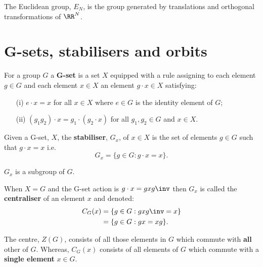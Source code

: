\documentclass[12pt, a4paper]{article}
\begin{document}
\begin{mdthm}
    The Euclidean group, \(E_N\), is the group generated by translations and orthogonal transformations of \(\RR^N\).
\end{mdthm}

\pagebreak

\section{G-sets, stabilisers and orbits}

\begin{definition}
    For a group \(G\) a \textbf{G-set} is a set \(X\) equipped with a rule assigning to each element \(g\in G\) and each element \(x\in X\) an element \(g\cdot x \in X\) satisfying:
    \begin{itemize}
    \item[(i)] \(e \cdot x =x\) for all \(x \in X\) where \(e \in G\) is the identity element of \(G\);
    \item[(ii)] \((g_1g_2)\cdot x =g_1\cdot(g_2 \cdot x)\) for all \(g_1,g_2 \in G\) and \(x\in X\).
    \end{itemize}
\end{definition}

\begin{definition}
    Given a G-set, \(X\), the \textbf{stabiliser}, \(G_x\), of \(x \in X\) is the set of elements \(g \in G\) such that \(g \cdot x =x\) i.e.
    \[G_x = \{ g \in G : g\cdot x =x\}.\]
\end{definition}

\begin{mdthm}
    \(G_x\) is a subgroup of \(G\).
\end{mdthm}

\begin{definition}
    When \(X=G\) and the G-set action is \(g \cdot x=gxg\inv\) then \(G_x\) is called the \textbf{centraliser} of an element \(x\) and denoted:
    \[\begin{aligned}
        C_{G}(x)&=\{g \in G : gxg\inv=x\} \\
        &=\{g\in G : gx=xg\}.
    \end{aligned}\]
\end{definition}

\begin{mdremark}
    The centre, \(Z(G)\), consists of all those elements in \(G\) which commute with \textbf{all} other of \(G\). Whereas, \(C_G(x)\) consists of all elements of \(G\) which commute with a \textbf{single element} \(x \in G\).
\end{mdremark}
\end{document}

